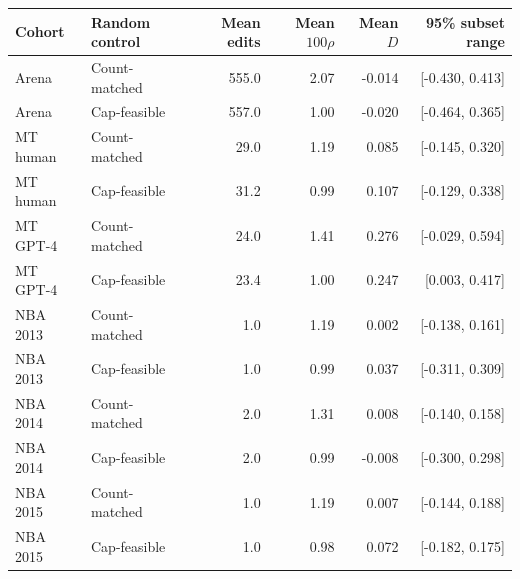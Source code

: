 \begin{tabular}{llrrrr}
\toprule
Cohort & Random control & Mean edits & Mean $100\rho$ & Mean $D$ & 95\% subset range \\
\midrule
Arena & Count-matched & 555.0 & 2.07 & -0.014 & [-0.430, 0.413] \\
Arena & Cap-feasible & 557.0 & 1.00 & -0.020 & [-0.464, 0.365] \\
MT human & Count-matched & 29.0 & 1.19 & 0.085 & [-0.145, 0.320] \\
MT human & Cap-feasible & 31.2 & 0.99 & 0.107 & [-0.129, 0.338] \\
MT GPT-4 & Count-matched & 24.0 & 1.41 & 0.276 & [-0.029, 0.594] \\
MT GPT-4 & Cap-feasible & 23.4 & 1.00 & 0.247 & [0.003, 0.417] \\
NBA 2013 & Count-matched & 1.0 & 1.19 & 0.002 & [-0.138, 0.161] \\
NBA 2013 & Cap-feasible & 1.0 & 0.99 & 0.037 & [-0.311, 0.309] \\
NBA 2014 & Count-matched & 2.0 & 1.31 & 0.008 & [-0.140, 0.158] \\
NBA 2014 & Cap-feasible & 2.0 & 0.99 & -0.008 & [-0.300, 0.298] \\
NBA 2015 & Count-matched & 1.0 & 1.19 & 0.007 & [-0.144, 0.188] \\
NBA 2015 & Cap-feasible & 1.0 & 0.98 & 0.072 & [-0.182, 0.175] \\
\bottomrule
\end{tabular}
